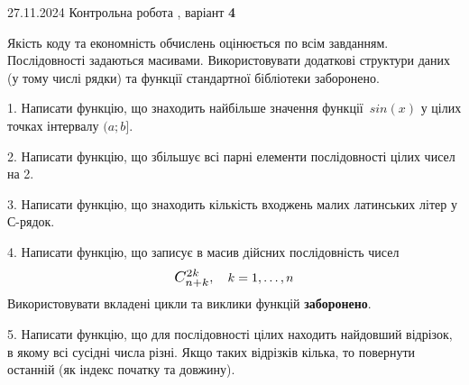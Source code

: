 \documentclass[12pt, ukrainian]{article}
\begin{document}
{{{\begin {large}
\end{large}
\vspace{35mm}


{{27.11.2024 Контрольна робота , варіант  \No \textbf { 4 }\par}}


{
Якість коду та економність обчислень оцінюється по всім завданням. Послідовності задаються масивами. Використовувати додаткові структури даних (у тому числі рядки) та функції стандартної бібліотеки заборонено.

\vspace{2mm}

\begin {large}
1. Написати функцію, що знаходить найбільше значення функції~$sin(x)$ у цілих точках інтервалу $(a; b]$.

\vspace{2mm}


2. Написати функцію, що збільшує всі парні елементи послідовності цілих чисел на 2.

\vspace{2mm}


3. Написати функцію, що знаходить кількість входжень малих латинських літер у С-рядок.

\vspace{2mm}


4. 
Написати функцію, що записує в масив дійсних послідовність чисел
$$\scalebox{1.2}{$C_{n+k}^{2k}$}, \quad k=1,\ldots,n$$
Використовувати вкладені цикли та виклики функцій \textbf{заборонено}.

\vspace{2mm}


5. Написати функцію, що для послідовності цілих находить найдовший відрізок, в якому всі сусідні числа різні. Якщо таких відрізків кілька, то повернути останній (як індекс початку та довжину).

\vspace{2mm}


\end{large}}}}}
\end{document}
